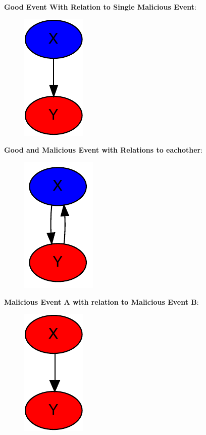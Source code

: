 	\newpar \textbf{Good Event With Relation to Single Malicious Event}:
	 
	\begin{figure}[H]
		\centering
		\includegraphics[]{6consensus/images/2.pdf}
		\caption{}
		\label{fig:consensus:single}
	\end{figure}
	
	\newpar \textbf{Good and Malicious Event with Relations to eachother}:
	
	\begin{figure}[H]
		\centering
		\includegraphics[]{6consensus/images/6.pdf}
		\caption{}
		\label{fig:consensus:single}
	\end{figure}
	
	\newpar \textbf{Malicious Event A with relation to Malicious Event B}: 
	
	\begin{figure}[H]
		\centering
		\includegraphics[]{6consensus/images/4.pdf}
		\caption{}
		\label{fig:consensus:single}
	\end{figure}
	
